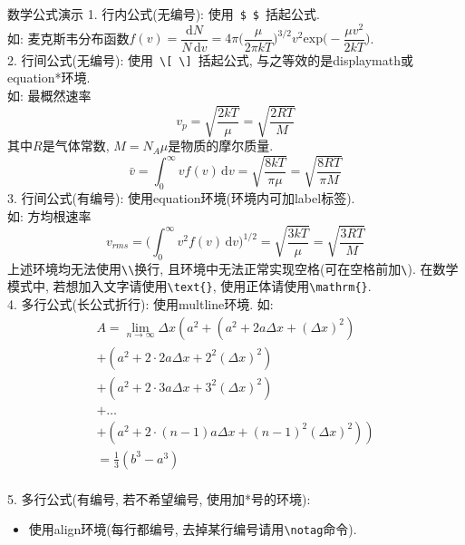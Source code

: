 \documentclass[hyperref, UTF8, CJK, aspectratio=169]{beamer}
\begin{document}
\begin{frame}{数学公式演示}
	\alert{1. 行内公式(无编号):} 使用~\verb|$|~\verb|$|~括起公式.\\
	如: 麦克斯韦分布函数$f(v) = \dfrac{\mathrm{d}N}{N\,\mathrm{d}v} = 4\pi \Big(\dfrac{\mu}{2\pi kT}\Big)^{3/2} v^2 \mathrm{exp}\Big(-\dfrac{\mu v^2}{2kT}\Big)$.\\[1ex]
	{\color{scured}2. 行间公式(无编号):} 使用~\verb|\[|~\verb|\]|~括起公式, 与之等效的是displaymath或equation*环境.\\
	如: 最概然速率\[v_p = \sqrt{\dfrac{2kT}{\mu}} = \sqrt{\dfrac{2RT}{M}}\]其中$R$是气体常数, $M = N_A \mu$是物质的摩尔质量.\\[1ex]
		\begin{equation*}
			\bar{v} = \int_0^\infty vf(v)\,\mathrm{d}v = \sqrt{\dfrac{8kT}{\pi\mu}} = \sqrt{\dfrac{8RT}{\pi M}}
		\end{equation*}
	{\color{scured}3. 行间公式(有编号):} 使用equation环境(环境内可加label标签).\\[1ex]
	如: 方均根速率
		\begin{equation}
		v_{rms} = \Big(\int_0^\infty v^2f(v)\,\mathrm{d}v\Big)^{1/2} = \sqrt{\dfrac{3kT}{\mu}} = \sqrt{\dfrac{3RT}{M}}
		\end{equation}
	上述环境均无法使用\verb!\\!换行, 且环境中无法正常实现空格(可在空格前加\verb|\|). 在数学模式中, 若想加入文字请使用\verb|\text|\verb|{}|, 使用正体请使用\verb|\mathrm|\verb|{}|.\\[1ex]
	{\color{scured}4. 多行公式(长公式折行):} 使用multline环境.
	如: 
		\begin{multline}
			A=\lim_{n\rightarrow\infty}\Delta x\left(a^{2}+\left(a^{2}+2a\Delta x+\left(\Delta x\right)^{2}\right)\right.\label{eq:reset}\\
			+\left(a^{2}+2\cdot2a\Delta x+2^{2}\left(\Delta x\right)^{2}\right)\\
			+\left(a^{2}+2\cdot3a\Delta x+3^{2}\left(\Delta x\right)^{2}\right)\\
			+\ldots\\
			\left.+\left(a^{2}+2\cdot(n-1)a\Delta x+(n-1)^{2}\left(\Delta x\right)^{2}\right)\right)\\
			=\frac{1}{3}\left(b^{3}-a^{3}\right)
		\end{multline}\\[1ex]
	\pagebreak
	{\color{scured}5. 多行公式(有编号, 若不希望编号, 使用加*号的环境):}
	\begin{itemize}
		\item 使用align环境(每行都编号, 去掉某行编号请用\verb|\notag|命令).

\end{itemize}
\end{frame}
\end{document}

